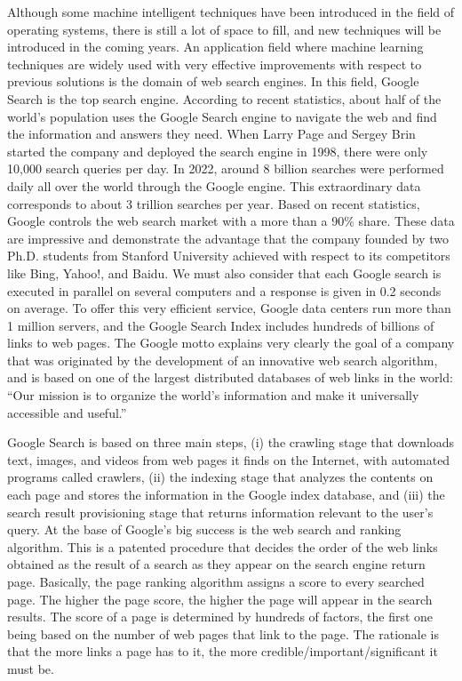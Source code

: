 Although some machine intelligent techniques have been introduced in the field of operating systems, there is still a lot of space to fill, and new techniques will be introduced in the coming years. An application field where machine learning techniques are widely used with very effective improvements with respect to previous solutions is the domain of web search engines. In this field, Google Search is the top search engine. According to recent statistics, about half of the world's population uses the Google Search engine to navigate the web and find the information and answers they need. When Larry Page and Sergey Brin started the company and deployed the search engine in 1998, there were only 10,000 search queries per day. In 2022, around 8 billion searches were performed daily all over the world through the Google engine. This extraordinary data corresponds to about 3 trillion searches per year. Based on recent statistics, Google controls the web search market with a more than a 90\% share. These data are impressive and demonstrate the advantage that the company founded by two Ph.D. students from Stanford University achieved with respect to its competitors like Bing, Yahoo!, and Baidu. We must also consider that each Google search is executed in parallel on several computers and a response is given in 0.2 seconds on average. To offer this very efficient service, Google data centers run more than 1 million servers, and the Google Search Index includes hundreds of billions of links to web pages. The Google motto explains very clearly the goal of a company that was originated by the development of an innovative web search algorithm, and is based on one of the largest distributed databases of web links in the world: ``Our mission is to organize the world's information and make it universally accessible and useful.''


Google Search is based on three main steps, (i) the crawling stage that downloads text, images, and videos from web pages it finds on the Internet, with automated programs called crawlers, (ii) the indexing stage that analyzes the contents on each page and stores the information in the Google index database, and (iii) the search result provisioning stage that returns information relevant to the user's query. At the base of Google's big success is the web search and ranking algorithm. This is a patented procedure that decides the order of the web links obtained as the result of a search as they appear on the search engine return page. Basically, the page ranking algorithm assigns a score to every searched page. The higher the page score, the higher the page will appear in the search results. The score of a page is determined by hundreds of factors, the first one being based on the number of web pages that link to the page. The rationale is that the more links a page has to it, the more credible/important/significant it must be.

